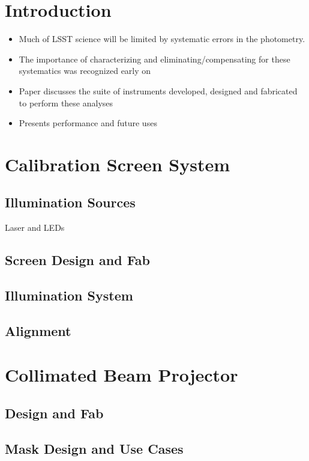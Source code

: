 \section{Introduction}

\begin{itemize} 
\item 
Much of LSST science will be limited by systematic errors in the photometry. 
\item 
The importance of characterizing and eliminating/compensating for these systematics was recognized early on
\item
Paper discusses the suite of instruments developed, designed and fabricated to perform these analyses
\item
Presents performance and future uses
\end{itemize}

 
\section{Calibration Screen System} 

\subsection{Illumination Sources} 
Laser and LEDs

\subsection{Screen Design and Fab}

\subsection{Illumination System}

\subsection{Alignment}


\section{Collimated Beam Projector}

\subsection{Design and Fab}

\subsection{Mask Design and Use Cases}

